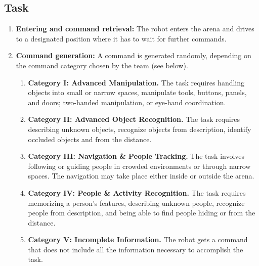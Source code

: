 \subsection{Task}

\begin{enumerate}
	\item \textbf{Entering and command retrieval:} The robot enters the arena and drives to a designated position where it has to wait for further commands. \\

	\item \textbf{Command generation:} A command is generated randomly, depending on the command category chosen by the team (see below). \\

	\begin{enumerate}
		\item \textbf{Category I: Advanced Manipulation.} The task requires handling objects into small or narrow spaces, manipulate tools, buttons, panels, and doors; two-handed manipulation, or eye-hand coordination.

		\item \textbf{Category II: Advanced Object Recognition.} The task requires describing unknown objects, recognize objects from description, identify occluded objects and from the distance.

		\item \textbf{Category III: Navigation \& People Tracking.} The task involves following or guiding people in crowded environments or through narrow spaces. The navigation may take place either inside or outside the arena.

		\item \textbf{Category IV: People \& Activity Recognition.} The task requires memorizing a person's features, describing unknown people, recognize people from description, and being able to find people hiding or from the distance.


		\item \textbf{Category V: Incomplete Information.} The robot gets a command that does not include all the information necessary to accomplish the task.


\end{enumerate}
\end{enumerate}
